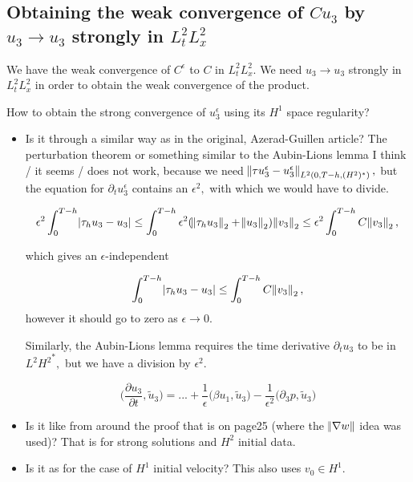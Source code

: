 \documentclass[11pt]{article}
\begin{document}
\subsection{Obtaining the weak convergence of $C u_3$ by $u_3 \to u_3$ strongly in $L^2_t L^2_x$}

We have the weak convergence of $C^\epsilon$ to $C$ in $L^2_t L^2_x.$ We need $u_3 \to u_3$ strongly in $L^2_t L^2_x$ in order to obtain the weak convergence of the product.

How to obtain the strong convergence of $u_3^\epsilon$ using its $H^1$ space regularity?

\begin{itemize}

\item Is it \textcolor{ao}{through a similar way as in the original, Azerad-Guillen article}? The perturbation theorem or something similar to the Aubin-Lions lemma I think / it seems / does not work,
 because we need $\norm{\tau u_3^\epsilon - u_3^\epsilon}_{L^2(0, T-h, (H^2)^*)},$ but the equation for $\partial_t u^\epsilon_3$ contains an $\epsilon^2,$ with which we would have to divide.
 
 $$ \epsilon^2 \int_0^{T-h} \abs{\tau_h u_3 - u_3} \leq \int_0^{T-h} \epsilon^2 (\norm{\tau_h u_3}_2 + \norm{u_3}_2)\norm{v_3}_2 \leq \epsilon^2 \int_0 ^{T-h} C \norm{v_3}_2,$$
 
 which gives an $\epsilon$-independent
 
  $$ \int_0^{T-h} \abs{\tau_h u_3 - u_3} \leq \int_0 ^{T-h} C \norm{v_3}_2,$$ however it should go to zero as $\epsilon \to 0.$
  
  Similarly, the Aubin-Lions lemma requires the time derivative $\partial_t u_3$ to be in $L^2 {H^2}^*,$ but we have a division by $\epsilon^2.$
  
  $$ \bigg ( \frac{\partial u_3}{\partial t}, \tilde{u}_3 \bigg) = ... + \frac{1}{\epsilon} \bigg ( \beta u_1, \tilde{u}_3 \bigg) - \frac{1}{\epsilon^2} \bigg ( \partial_3 p, \tilde{u}_3 \bigg)$$
 
\item Is it \textcolor{cadmiumorange}{like from around the proof that is on page25 (where the $\norm{\nabla w}$ idea was used)}? That is for strong solutions and $H^2$ initial data.

\item Is it \textcolor{trueblue}{as for the case of $H^1$ initial velocity}? This also uses $v_0 \in H^1.$

\end{itemize}
\end{document}
